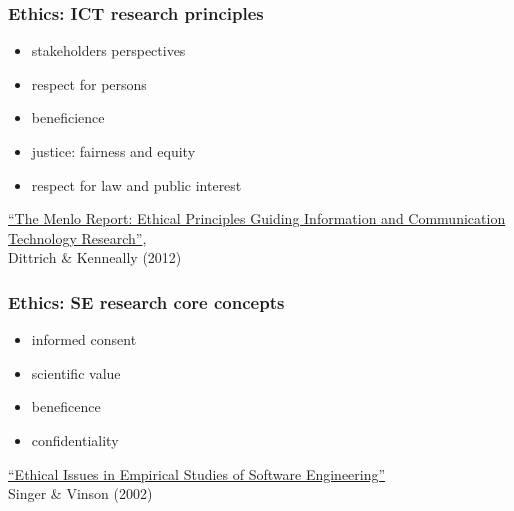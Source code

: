\documentclass[17pt,aspectratio=169,hyperref={pdfusetitle,colorlinks,allcolors=olive}]{beamer}
\begin{document}
\begin{frame}[fragile]
  \frametitle{Ethics: ICT research principles}

  \begin{itemize}
  \item stakeholders perspectives
  \item respect for persons
  \item beneficience
  \item justice: fairness and equity
  \item respect for law and public interest
  \end{itemize}

  \begin{flushright}
    {\footnotesize
      \href{https://www.dhs.gov/sites/default/files/publications/CSD-MenloPrinciplesCORE-20120803_1.pdf}{``The Menlo Report: Ethical Principles Guiding Information and Communication Technology Research''}, \\ Dittrich \& Kenneally (2012) \\
    }
  \end{flushright}
  
\end{frame}

\begin{frame}[fragile]
  \frametitle{Ethics: SE research core concepts}

  \begin{itemize}
  \item informed  consent
  \item scientific  value
  \item beneficence
  \item confidentiality
  \end{itemize}

  \begin{flushright}
    {\footnotesize
      \href{http://cogprints.org/3299/1/NRC-44912.pdf}{``Ethical Issues in Empirical Studies of Software Engineering''} \\
      Singer \& Vinson (2002) \\
    }
  \end{flushright}
  
\end{frame}
\end{document}

